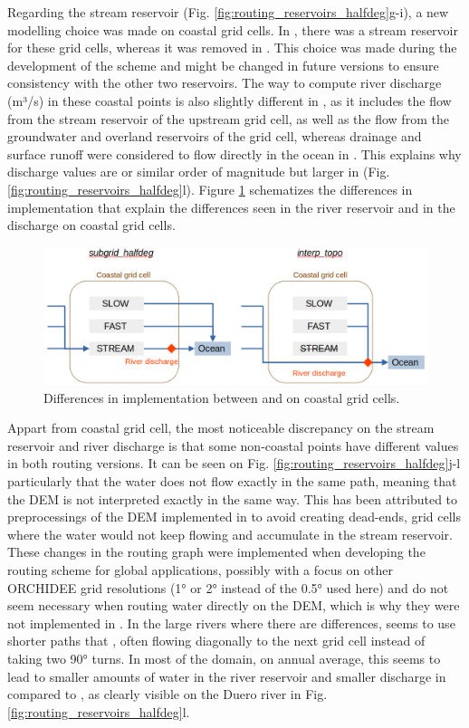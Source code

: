 Regarding the stream reservoir (Fig. \ref{fig:routing_reservoirs_halfdeg}g-i), a new modelling choice was made on coastal grid cells. In \std, there was a stream reservoir for these grid cells, whereas it was removed in \native. This choice was made during the development of the scheme and might be changed in future versions to ensure consistency with the other two reservoirs. 
The way to compute river discharge (m³/s) in these coastal points is also slightly different in \native, as it includes the flow from the stream reservoir of the upstream grid cell, as well as the flow from the groundwater and overland reservoirs of the grid cell, whereas drainage and surface runoff were considered to flow directly in the ocean in \std. This explains why discharge values are or similar order of magnitude but larger in \native (Fig. \ref{fig:routing_reservoirs_halfdeg}l). 
Figure \ref{fig:coastal_routing_behaviour} schematizes the differences in implementation that explain the differences seen in the river reservoir and in the discharge on coastal grid cells.

\begin{figure}[htbp]
    \centering
    \includegraphics[width=\textwidth]{images/chap3/coastal_routing_behaviour_v2.png
}
    \caption{Differences in implementation between \std and \native on coastal grid cells.}
    \label{fig:coastal_routing_behaviour}
\end{figure}

Appart from coastal grid cell, the most noticeable discrepancy on the stream reservoir and river discharge is that some non-coastal points have different values in both routing versions. It can be seen on Fig. \ref{fig:routing_reservoirs_halfdeg}j-l particularly that the water does not flow exactly in the same path, meaning that the DEM is not interpreted exactly in the same way. This has been attributed to preprocessings of the DEM implemented in \std to avoid creating dead-ends, grid cells where the water would not keep flowing and accumulate in the stream reservoir. These changes in the routing graph were implemented when developing the routing scheme for global applications, possibly with a focus on other ORCHIDEE grid resolutions (1° or 2° instead of the 0.5° used here) and do not seem necessary when routing water directly on the DEM, which is why they were not implemented in \native. In the large rivers where there are differences, \native seems to use shorter paths that \std, often flowing diagonally to the next grid cell instead of taking two 90° turns. In most of the domain, on annual average, this seems to lead to smaller amounts of water in the river reservoir and smaller discharge in \native compared to \std, as clearly visible on the Duero river in Fig. \ref{fig:routing_reservoirs_halfdeg}l.

